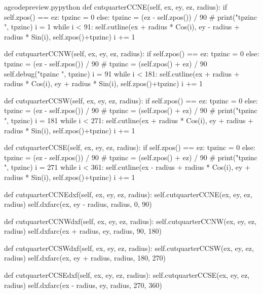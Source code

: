 \documentclass{ltxdoc}
\begin{document}
\lstset{firstnumber=\thegcpy}
\begin{writecode}{a}{gcodepreview.py}{python}
    def cutquarterCCNE(self, ex, ey, ez, radius):
        if self.zpos() == ez:
            tpzinc = 0
        else:
            tpzinc = (ez - self.zpos()) / 90
#        print("tpzinc ", tpzinc)
        i = 1
        while i < 91: 
            self.cutline(ex + radius * Cos(i), ey - radius + radius * Sin(i), self.zpos()+tpzinc)
            i += 1

    def cutquarterCCNW(self, ex, ey, ez, radius):
        if self.zpos() == ez:
            tpzinc = 0
        else:
            tpzinc = (ez - self.zpos()) / 90
#            tpzinc = (self.zpos() + ez) / 90
        self.debug("tpzinc ", tpzinc)
        i = 91
        while i < 181: 
            self.cutline(ex + radius + radius * Cos(i), ey + radius * Sin(i), self.zpos()+tpzinc)
            i += 1

    def cutquarterCCSW(self, ex, ey, ez, radius):
        if self.zpos() == ez:
            tpzinc = 0
        else:
            tpzinc = (ez - self.zpos()) / 90
#            tpzinc = (self.zpos() + ez) / 90
#        print("tpzinc ", tpzinc)
        i = 181
        while i < 271: 
            self.cutline(ex + radius * Cos(i), ey + radius + radius * Sin(i), self.zpos()+tpzinc)
            i += 1

    def cutquarterCCSE(self, ex, ey, ez, radius):
        if self.zpos() == ez:
            tpzinc = 0
        else:
            tpzinc = (ez - self.zpos()) / 90
#            tpzinc = (self.zpos() + ez) / 90
#        print("tpzinc ", tpzinc)
        i = 271
        while i < 361: 
            self.cutline(ex - radius + radius * Cos(i), ey + radius * Sin(i), self.zpos()+tpzinc)
            i += 1

    def cutquarterCCNEdxf(self, ex, ey, ez, radius):
        self.cutquarterCCNE(ex, ey, ez, radius)
        self.dxfarc(ex, ey - radius, radius,  0, 90)

    def cutquarterCCNWdxf(self, ex, ey, ez, radius):
        self.cutquarterCCNW(ex, ey, ez, radius)
        self.dxfarc(ex + radius, ey, radius, 90, 180)

    def cutquarterCCSWdxf(self, ex, ey, ez, radius):
        self.cutquarterCCSW(ex, ey, ez, radius)
        self.dxfarc(ex, ey + radius, radius, 180, 270)

    def cutquarterCCSEdxf(self, ex, ey, ez, radius):
        self.cutquarterCCSE(ex, ey, ez, radius)
        self.dxfarc(ex - radius, ey, radius, 270, 360)

\end{writecode}
\addtocounter{gcpy}{63}
\end{document}
